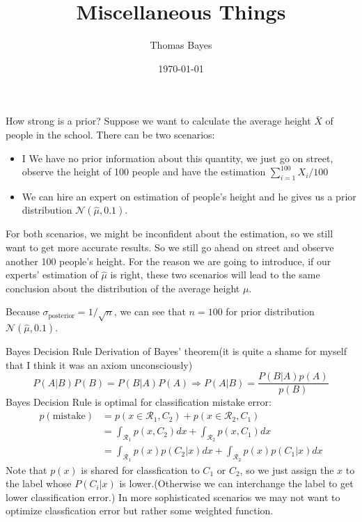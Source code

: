 \documentclass{beamer}
\title{Miscellaneous Things}
\author{Thomas Bayes}
\institute{
\texttt{[image: ../bayes.png]}%
}
\date{\today}
\begin{document}
    
\frame{\titlepage}

\begin{frame}[allowframebreaks]{How strong is a prior?}
Suppose we want to calculate the average height $\bar{X}$ of people in the school. There can be two scenarios: 
\begin{itemize}
\item I We have no prior information about this quantity, we just go on street, observe the height of 100 people and have the estimation $\sum_{i=1}^{100}{X_i} / 100$
\item We can hire an expert on estimation of people's height and he gives us a prior distribution $\mathcal{N}(\hat{\mu}, 0.1)$.
\end{itemize}
For both scenarios, we might be inconfident about the estimation, so we still want to get more accurate results. So we still go ahead on street and observe another 100 people's height. For the reason we are going to introduce, if our experts' estimation of $\hat{\mu}$ is right, these two scenarios will lead to the same conclusion about the distribution of the average height $\mu$.

\framebreak

Because $\sigma_\text{posterior} = 1/ \sqrt{n}$, we can see that $n = 100$ for prior
distribution $\mathcal{N}(\hat{\mu},0.1)$.
\end{frame}
 
\begin{frame}{Bayes Decision Rule}
Derivation of Bayes' theorem(it is quite a shame for myself that I think it was an axiom unconsciously)
$$P(A|B) P(B) = P(B|A)P(A) \Rightarrow  P(A | B) = \frac{P(B|A) p(A)}{p(B)}$$
Bayes Decision Rule is optimal for classification mistake error:
\begin{align*}
p(\text{mistake}) & = p(x \in \mathcal{R}_1, C_2) + p(x \in \mathcal{R}_2, C_1) \\
& = \int_{\mathcal{R}_1} p(x, C_2) dx + \int_{\mathcal{R}_2} p(x, C_1)dx \\
& = \int_{\mathcal{R}_1} p(x) p(C_2|x) dx + \int_{\mathcal{R}_2} p(x) p(C_1 | x)dx
\end{align*}
Note that $p(x)$ is shared for classfication to $C_1$ or $C_2$, so we just assign the $x$ to the label whose $P(C_i | x)$ is lower.(Otherwise we can interchange the label to get lower classification error.) In more sophisticated scenarios we may not want to optimize classfication error but rather some weighted function.
\end{frame}
\end{document}
